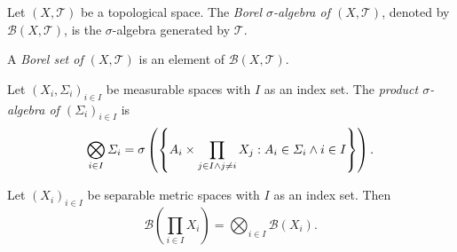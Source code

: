 \Bdf
  Let \((X, \mathcal{T})\) be a topological space. The \emph{Borel \(\sigma\)-algebra of \((X, \mathcal{T})\)}, denoted
  by \(\mathcal{B}(X, \mathcal{T})\), is the \(\sigma\)-algebra generated by \(\mathcal{T}\).

  A \emph{Borel set of \((X, \mathcal{T})\)} is an element of \(\mathcal{B}(X, \mathcal{T})\).
\Edf

Let \((X_i, \varSigma_i)_{i \in I}\) be measurable spaces with \(I\) as an index set. The \emph{product
\(\sigma\)-algebra of \((\varSigma_i)_{i \in I}\)} is
\[
  \bigotimes_{i \in I} \varSigma_i = \sigma\left(\set*{A_i \times \prod_{j \in I \land j \ne i} X_j :
  A_i \in \varSigma_i \land i \in I}\right).
\]

\Blm
  Let \((X_i)_{i \in I}\) be separable metric spaces with \(I\) as an index set. Then
  \[
    \mathcal{B}\left(\prod_{i \in I} X_i\right) = \bigotimes_{i \in I} \mathcal{B}(X_i).
  \]
\Elm

\Edc
